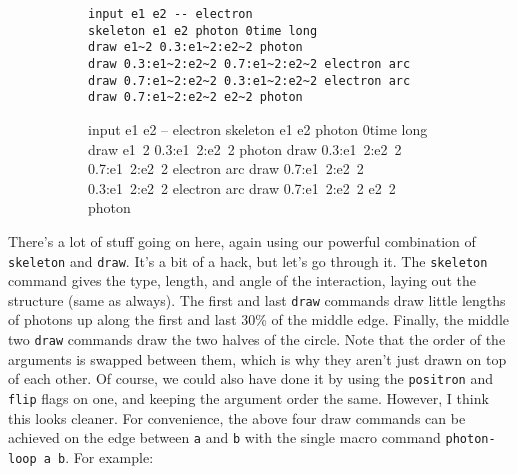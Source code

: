 \documentclass[12pt]{article}
\begin{document}
\begin{figure}[h!]\begin{subfigure}[h]{0.66\textwidth}\begin{center}
\begin{lstlisting}
input e1 e2 -- electron
skeleton e1 e2 photon 0time long
draw e1~2 0.3:e1~2:e2~2 photon
draw 0.3:e1~2:e2~2 0.7:e1~2:e2~2 electron arc
draw 0.7:e1~2:e2~2 0.3:e1~2:e2~2 electron arc
draw 0.7:e1~2:e2~2 e2~2 photon
\end{lstlisting}
\end{center}\end{subfigure}\hfill\vrule\hfill\begin{subfigure}[h]{0.2\textwidth}\begin{center}
\begin{feynr}
input e1 e2 -- electron
skeleton e1 e2 photon 0time long
draw e1~2 0.3:e1~2:e2~2 photon
draw 0.3:e1~2:e2~2 0.7:e1~2:e2~2 electron arc
draw 0.7:e1~2:e2~2 0.3:e1~2:e2~2 electron arc
draw 0.7:e1~2:e2~2 e2~2 photon
\end{feynr}
\end{center}\end{subfigure}\end{figure}
There's a lot of stuff going on here, again using our powerful combination of \texttt{skeleton} and \texttt{draw}.
It's a bit of a hack, but let's go through it.
The \texttt{skeleton} command gives the type, length, and angle of the interaction, laying out the structure (same as always).
The first and last \texttt{draw} commands draw little lengths of photons up along the first and last 30\% of the middle edge.
Finally, the middle two \texttt{draw} commands draw the two halves of the circle.
Note that the order of the arguments is swapped between them, which is why they aren't just drawn on top of each other.
Of course, we could also have done it by using the \texttt{positron} and \texttt{flip} flags on one, and keeping the argument order the same.
However, I think this looks cleaner.
For convenience, the above four draw commands can be achieved on the edge between \texttt{a} and \texttt{b} with the single macro command \texttt{photon-loop a b}.
For example:
\end{document}
